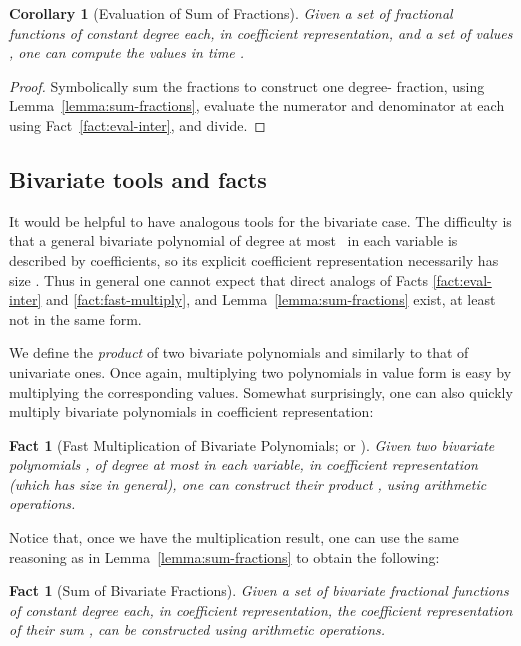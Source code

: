 \documentclass[11pt]{article}
\newtheorem{corollary}[theorem]{Corollary}
\newtheorem{fact}[theorem]{Fact}
\theoremstyle{remark}
\begin{document}
\begin{corollary}[Evaluation of Sum of Fractions]
  \label{cor:eval-sum-fractions}
  Given a set of  fractional functions  of constant
  degree each, in coefficient representation, and a set of  values
  , one can compute the  values  in 
  time .
\end{corollary}

\begin{proof}
  Symbolically sum the fractions to construct one degree-
  fraction, using Lemma~\ref{lemma:sum-fractions}, evaluate the
  numerator and denominator at each  using
  Fact~\ref{fact:eval-inter}, and divide.
\end{proof}

\subsection{Bivariate tools and facts}
\label{sec:bivariate-tools}

It would be helpful to have analogous tools for the bivariate case.
The difficulty is that a general bivariate polynomial of degree at most~ in
each variable is described by  coefficients, so its
explicit coefficient representation necessarily has size .  Thus
in general one cannot expect that direct analogs of
Facts \ref{fact:eval-inter} and \ref{fact:fast-multiply}, and
Lemma~\ref{lemma:sum-fractions} exist, at least not in the same form.

We define the \emph{product}  of two bivariate polynomials
 and  similarly to that of univariate ones.  Once again,
multiplying two polynomials in value form is easy by multiplying the
corresponding values.  Somewhat surprisingly, one can also quickly
multiply bivariate polynomials in coefficient representation:

\begin{fact}[Fast Multiplication of Bivariate Polynomials; \cite{p-smpm-94,bp-pmcfa-94} or {\cite[Corollary 8.28]{gg-mca-99}}]
  \label{fact:multiply-binomial}
  Given two bivariate polynomials ,  of degree at most
   in each variable, in coefficient representation (which has size
   in general), one can construct their product ,
  using  arithmetic operations.
\end{fact}



Notice that, once we have the multiplication result, one can use the
same reasoning as in Lemma~\ref{lemma:sum-fractions} to obtain the
following:


\begin{fact}[Sum of Bivariate Fractions]
  \label{fact:sum-fractions-bi}
  Given a set of  bivariate fractional functions
   of constant degree each, in coefficient
  representation, the coefficient representation of their sum
  , can be constructed using 
  arithmetic operations.
\end{fact}
\end{document}
